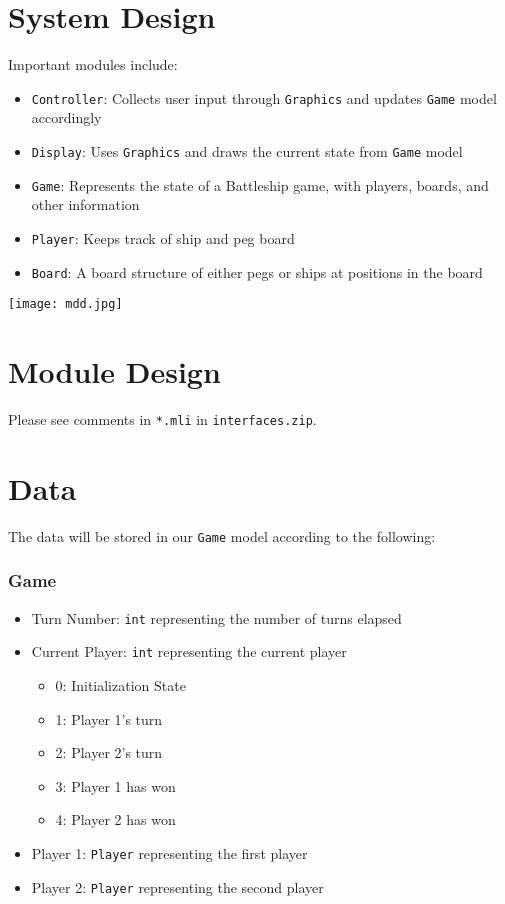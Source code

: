 \documentclass[10pt]{article}
\begin{document}
\part*{System Design}
Important modules include:
\begin{itemize}
    \item \texttt{Controller}: Collects user input through \texttt{Graphics} and updates \texttt{Game} model accordingly
    \item \texttt{Display}: Uses \texttt{Graphics} and draws the current state from \texttt{Game} model
    \item \texttt{Game}: Represents the state of a Battleship game, with players, boards, and other information
    \item \texttt{Player}: Keeps track of ship and peg board
    \item \texttt{Board}: A board structure of either pegs or ships at positions in the board
\end{itemize}
\texttt{[image: mdd.jpg]}

\part*{Module Design}
Please see comments in \texttt{*.mli} in \texttt{interfaces.zip}.

\clearpage
\part*{Data}
The data will be stored in our \texttt{Game} model according to the following:
\section*{Game}
\begin{itemize}
    \item Turn Number: \texttt{int} representing the number of turns elapsed
    \item Current Player: \texttt{int} representing the current player
        \begin{itemize}
            \item 0: Initialization State
            \item 1: Player 1's turn
            \item 2: Player 2's turn
            \item 3: Player 1 has won
            \item 4: Player 2 has won
        \end{itemize}
    \item Player 1: \texttt{Player} representing the first player
    \item Player 2: \texttt{Player} representing the second player
\end{itemize}
\end{document}
